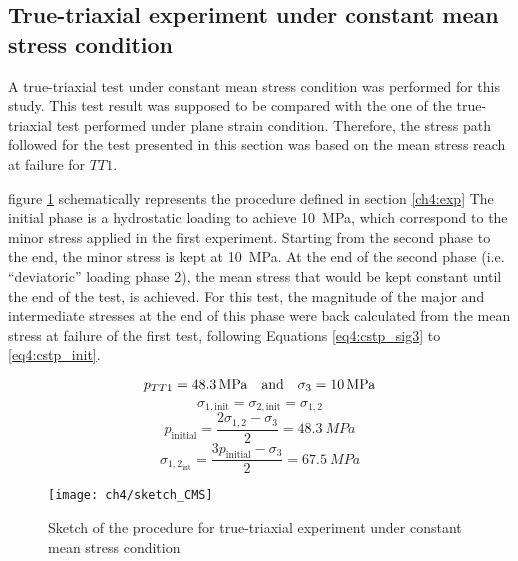 \subsection{True-triaxial experiment under constant mean stress condition}

A true-triaxial test under constant mean stress condition was performed for this study. This test result was supposed to be compared with the one of the true-triaxial test performed under plane strain condition. Therefore, the stress path followed for the test presented in this section was based on the mean stress reach at failure for $TT1$.

figure \ref{fig4:16} schematically represents the procedure defined in section \ref{ch4:exp} The initial phase is a hydrostatic loading to achieve \SI{10}{MPa}, which correspond to the minor stress applied in the first experiment. Starting from the second phase to the end, the minor stress is kept at \SI{10}{MPa}. At the end of the second phase (i.e. “deviatoric” loading phase 2), the mean stress that would be kept constant until the end of the test, is achieved. For this test, the magnitude of the major and intermediate stresses at the end of this phase were back calculated from the mean stress at failure of the first test, following Equations \ref{eq4:cstp_sig3} to \ref{eq4:cstp_init}.

\begin{equation}\label{eq4:cstp_sig3}
    p_{TT1} = \SI{48.3}{MPa} \quad \textmd{and} \quad \sigma_3 = \SI{10}{MPa}
\end{equation}
\begin{equation}
    \sigma_{1,\text{init}} = \sigma_{2,\text{init}} = \sigma_{1,2}
\end{equation}
\begin{equation}
    p_\text{initial} = \frac{2\sigma_{1,2}-\sigma_3}{2} = \SI{48.3}{MPa}
\end{equation}
\begin{equation}\label{eq4:cstp_init}
    \sigma_{1,2_{\text{int}}} = \frac{3p_\text{initial}-\sigma_3}{2} = \SI{67.5}{MPa}
\end{equation}
    

\begin{figure}[tb]
    \centering
    \texttt{[image: ch4/sketch\_CMS]}
    \caption{Sketch of the procedure for true-triaxial experiment under constant mean stress condition}
    \label{fig4:16}
\end{figure} 

